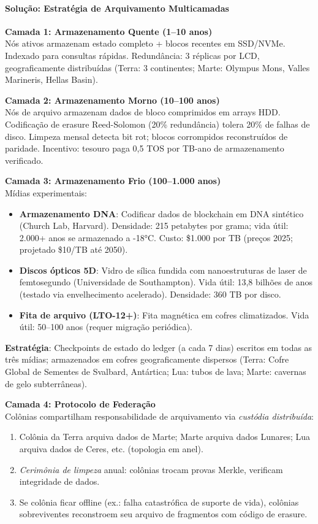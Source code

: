 \documentclass[11pt]{article}
\begin{document}
\paragraph{Solução: Estratégia de Arquivamento Multicamadas}

\textbf{Camada 1: Armazenamento Quente (1--10 anos)}\\
Nós ativos armazenam estado completo + blocos recentes em SSD/NVMe. Indexado para consultas rápidas. Redundância: 3 réplicas por LCD, geograficamente distribuídas (Terra: 3 continentes; Marte: Olympus Mons, Valles Marineris, Hellas Basin).

\textbf{Camada 2: Armazenamento Morno (10--100 anos)}\\
Nós de arquivo armazenam dados de bloco comprimidos em arrays HDD. Codificação de erasure Reed-Solomon (20\% redundância) tolera 20\% de falhas de disco. Limpeza mensal detecta bit rot; blocos corrompidos reconstruídos de paridade. Incentivo: tesouro paga 0,5 TOS por TB-ano de armazenamento verificado.

\textbf{Camada 3: Armazenamento Frio (100--1.000 anos)}\\
Mídias experimentais:
\begin{itemize}[noitemsep]
  \item \textbf{Armazenamento DNA}: Codificar dados de blockchain em DNA sintético (Church Lab, Harvard). Densidade: 215 petabytes por grama; vida útil: 2.000+ anos se armazenado a -18°C. Custo: \$1.000 por TB (preços 2025; projetado \$10/TB até 2050).
  \item \textbf{Discos ópticos 5D}: Vidro de sílica fundida com nanoestruturas de laser de femtosegundo (Universidade de Southampton). Vida útil: 13,8 bilhões de anos (testado via envelhecimento acelerado). Densidade: 360 TB por disco.
  \item \textbf{Fita de arquivo (LTO-12+)}: Fita magnética em cofres climatizados. Vida útil: 50--100 anos (requer migração periódica).
\end{itemize}
\textbf{Estratégia}: Checkpoints de estado do ledger (a cada 7 dias) escritos em todas as três mídias; armazenados em cofres geograficamente dispersos (Terra: Cofre Global de Sementes de Svalbard, Antártica; Lua: tubos de lava; Marte: cavernas de gelo subterrâneas).

\textbf{Camada 4: Protocolo de Federação}\\
Colônias compartilham responsabilidade de arquivamento via \emph{custódia distribuída}:
\begin{enumerate}[noitemsep]
  \item Colônia da Terra arquiva dados de Marte; Marte arquiva dados Lunares; Lua arquiva dados de Ceres, etc. (topologia em anel).
  \item \emph{Cerimônia de limpeza} anual: colônias trocam provas Merkle, verificam integridade de dados.
  \item Se colônia ficar offline (ex.: falha catastrófica de suporte de vida), colônias sobreviventes reconstroem seu arquivo de fragmentos com código de erasure.
\end{enumerate}
\end{document}
